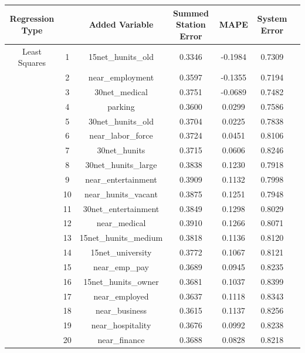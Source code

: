 \documentclass{article}
\begin{document}
\begin{center}
\begin{tabular}{ c c c c c c c }
\hline
Regression Type&&Added Variable&Summed Station Error&MAPE&System Error \\
\hline
Least Squares&1&15net\_hunits\_old&0.3346&-0.1984&0.7309\\
&2&near\_employment&0.3597&-0.1355&0.7194\\
&3&30net\_medical&0.3751&-0.0689&0.7482\\
&4&parking&0.3600&0.0299&0.7586\\
&5&30net\_hunits\_old&0.3704&0.0225&0.7838\\
&6&near\_labor\_force&0.3724&0.0451&0.8106\\
&7&30net\_hunits&0.3715&0.0606&0.8246\\
&8&30net\_hunits\_large&0.3838&0.1230&0.7918\\
&9&near\_entertainment&0.3909&0.1132&0.7998\\
&10&near\_hunits\_vacant&0.3875&0.1251&0.7948\\
&11&30net\_entertainment&0.3849&0.1298&0.8029\\
&12&near\_medical&0.3910&0.1266&0.8071\\
&13&15net\_hunits\_medium&0.3818&0.1136&0.8120\\
&14&15net\_university&0.3772&0.1067&0.8121\\
&15&near\_emp\_pay&0.3689&0.0945&0.8235\\
&16&15net\_hunits\_owner&0.3681&0.1037&0.8399\\
&17&near\_employed&0.3637&0.1118&0.8343\\
&18&near\_business&0.3615&0.1137&0.8256\\
&19&near\_hospitality&0.3676&0.0992&0.8238\\
&20&near\_finance&0.3688&0.0828&0.8218\\
\end{tabular}
\end{center}
\end{document}
